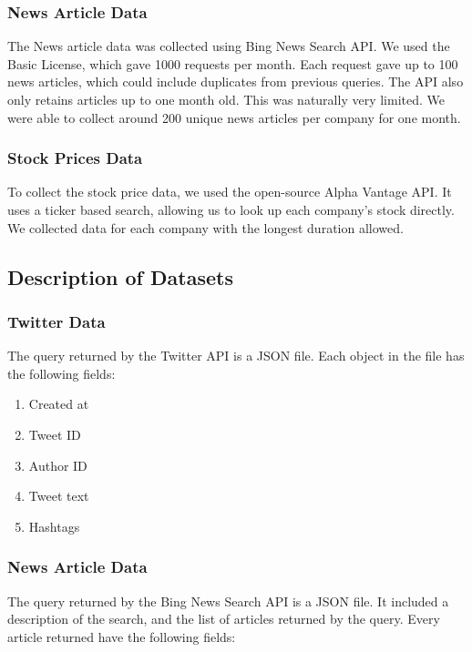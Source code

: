 \documentclass[sigconf, nonacm]{acmart}
\begin{document}
\subsubsection{News Article Data}
The News article data was collected using Bing News Search API. We used the Basic License, which gave 1000 requests per month. Each request gave up to 100 news articles, which could include duplicates from previous queries. The API also only retains articles up to one month old. This was naturally very limited. We were able to collect around 200 unique news articles per company for one month.

\subsubsection{Stock Prices Data}
To collect the stock price data, we used the open-source Alpha Vantage API. It uses a ticker based search, allowing us to look up each company's stock directly. We collected data for each company with the longest duration allowed.

\subsection{Description of Datasets} %
\subsubsection{Twitter Data}
The query returned by the Twitter API is a JSON file. Each object in the file has the following fields:

\begin{enumerate}
    \item Created at
    \item Tweet ID
    \item Author ID
    \item Tweet text
    \item Hashtags
\end{enumerate}

\subsubsection{News Article Data}
The query returned by the Bing News Search API is a JSON file. It included a description of the search, and the list of articles returned by the query. Every article returned have the following fields:
\end{document}

